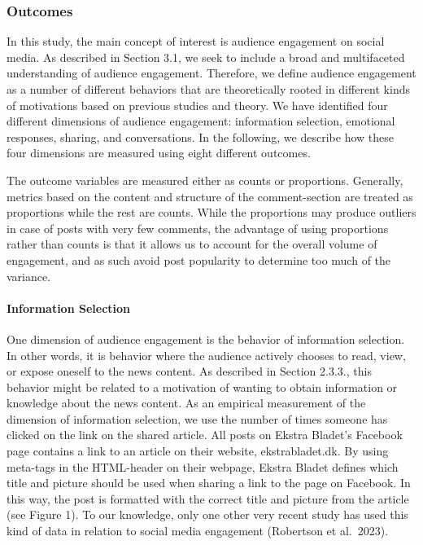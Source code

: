 \documentclass[
]{article}
\begin{document}
\hypertarget{outcomes}{%
\subsubsection{Outcomes}\label{outcomes}}

\noindent In this study, the main concept of interest is audience
engagement on social media. As described in Section 3.1, we seek to
include a broad and multifaceted understanding of audience engagement.
Therefore, we define audience engagement as a number of different
behaviors that are theoretically rooted in different kinds of
motivations based on previous studies and theory. We have identified
four different dimensions of audience engagement: information selection,
emotional responses, sharing, and conversations. In the following, we
describe how these four dimensions are measured using eight different
outcomes.

The outcome variables are measured either as counts or proportions.
Generally, metrics based on the content and structure of the
comment-section are treated as proportions while the rest are counts.
While the proportions may produce outliers in case of posts with very
few comments, the advantage of using proportions rather than counts is
that it allows us to account for the overall volume of engagement, and
as such avoid post popularity to determine too much of the variance.

\hypertarget{information-selection-1}{%
\paragraph*{Information Selection}\label{information-selection-1}}

\hspace{-2.5em}

\noindent One dimension of audience engagement is the behavior of
information selection. In other words, it is behavior where the audience
actively chooses to read, view, or expose oneself to the news content.
As described in Section 2.3.3., this behavior might be related to a
motivation of wanting to obtain information or knowledge about the news
content. As an empirical measurement of the dimension of information
selection, we use the number of times someone has clicked on the link on
the shared article. All posts on Ekstra Bladet's Facebook page contains
a link to an article on their website, ekstrabladet.dk. By using
meta-tags in the HTML-header on their webpage, Ekstra Bladet defines
which title and picture should be used when sharing a link to the page
on Facebook. In this way, the post is formatted with the correct title
and picture from the article (see Figure 1). To our knowledge, only one
other very recent study has used this kind of data in relation to social
media engagement (Robertson et al.~2023).
\end{document}
